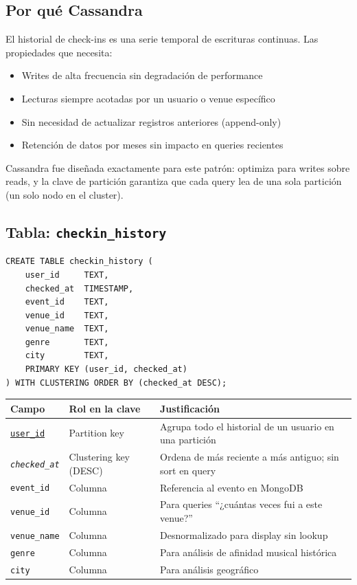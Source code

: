 \documentclass[12pt, a4paper]{article}
\newcommand{\code}[1]{\texttt{#1}}
\newcommand{\pk}[1]{\underline{\texttt{#1}}}   %
\newcommand{\ck}[1]{\texttt{\textit{#1}}}       %
\begin{document}
\subsection{Por qué Cassandra}

El historial de check-ins es una serie temporal de escrituras continuas.
Las propiedades que necesita:

\begin{itemize}[nosep]
  \item Writes de alta frecuencia sin degradación de performance
  \item Lecturas siempre acotadas por un usuario o venue específico
  \item Sin necesidad de actualizar registros anteriores (append-only)
  \item Retención de datos por meses sin impacto en queries recientes
\end{itemize}

Cassandra fue diseñada exactamente para este patrón: optimiza para writes
sobre reads, y la clave de partición garantiza que cada query lea de una
sola partición (un solo nodo en el cluster).

\subsection{Tabla: \code{checkin\_history}}

\begin{lstlisting}[style=cypher, caption={CQL equivalente de la entidad}]
CREATE TABLE checkin_history (
    user_id     TEXT,
    checked_at  TIMESTAMP,
    event_id    TEXT,
    venue_id    TEXT,
    venue_name  TEXT,
    genre       TEXT,
    city        TEXT,
    PRIMARY KEY (user_id, checked_at)
) WITH CLUSTERING ORDER BY (checked_at DESC);
\end{lstlisting}

\begin{tabularx}{\textwidth}{@{}llX@{}}
  \toprule
  \textbf{Campo}     & \textbf{Rol en la clave}  & \textbf{Justificación} \\
  \midrule
  \pk{user\_id}      & Partition key             & Agrupa todo el historial de un usuario en una partición \\
  \ck{checked\_at}   & Clustering key (DESC)     & Ordena de más reciente a más antiguo; sin sort en query \\
  \code{event\_id}   & Columna                   & Referencia al evento en MongoDB \\
  \code{venue\_id}   & Columna                   & Para queries ``¿cuántas veces fui a este venue?'' \\
  \code{venue\_name} & Columna                   & Desnormalizado para display sin lookup \\
  \code{genre}       & Columna                   & Para análisis de afinidad musical histórica \\
  \code{city}        & Columna                   & Para análisis geográfico \\
  \bottomrule
\end{tabularx}
\end{document}
